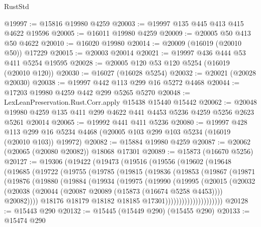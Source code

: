 \begin{lexlean}{RustStd}
\begin{coremodule}
@19997 := @15816 @19980 @4259
@20003 := @19997 @135 @445 @413 @415 @4622 @19596
@20005 := @16011 @19980 @4259
@20009 := @20005 @50 @413 @50 @4622
@20010 := @16020 @19980
@20014 := @20009 (@16019 (@20010 @50)) @17229
@20015 := @20003 @20014
@20021 := @19997 @436 @444 @53 @411 @5254 @19595
@20028 := @20005 @120 @53 @120 @5254 (@16019 (@20010 @120))
@20030 := @16027 (@16028 @5254)
@20032 := @20021 (@20028 @20030)
@20038 := @19997 @442 @113 @299 @16 @5272 @4468
@20044 := @17203 @19980 @4259 @442 @299 @5265 @5270
@20048 := LexLeanPreservation.Rust.Corr.apply @15438 @15440 @15442
@20062 := @20048 @19980 @4259 @135 @411 @299 @4622 @441 @4453 @5236 @4259 @5256 @2623 @5261 @20014
@20065 := @19992 @441 @411 @5236
@20080 := @19997
    @428
    @113
    @299
    @16
    @5234
    @4468
    (@20005 @103 @299 @103 @5234 (@16019 (@20010 @103)) @19972)
@20082 := @15884 @19980 @4259
@20087 := @20062 (@20065 (@20080 @20082)) @18068 @17301
@20089 := @15873 (@16670 @5256)
@20127 := @19306
    (@19422
      (@19473
        (@19516
          (@19556
            (@19602
              (@19648
                (@19685
                  (@19722
                    (@19755
                      (@19785
                        (@19815
                          (@19836
                            (@19853
                              (@19867
                                (@19871
                                  (@19876
                                    (@19880
                                      (@19884
                                        (@19934
                                          (@19975
                                            (@19990
                                              (@19995
                                                (@20015
                                                  (@20032
                                                    (@20038
                                                      (@20044
                                                        (@20087
                                                          @20089
                                                          (@15873 (@16674 @5258 @4453))))
                                                      @20082))))
                                              @18176
                                              @18179
                                              @18182
                                              @18185
                                              @17301)))))))))))))))))))))
@20128 := @15443 @290
@20132 := @15445 (@15449 @290) (@15455 @290)
@20133 := @15474 @290

\end{coremodule}
\end{lexlean}
